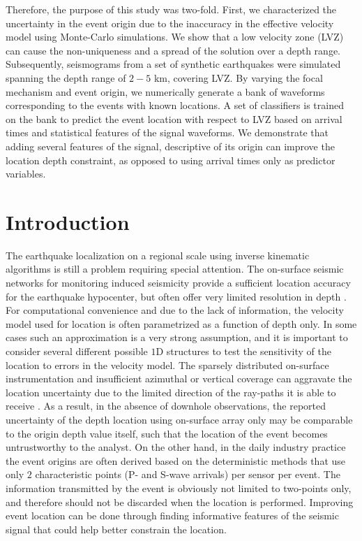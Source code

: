\documentclass[letterpaper,11pt]{article}
\begin{document}
Therefore, the purpose of this study was two-fold. First, we characterized the uncertainty in the event origin due to the inaccuracy in the effective velocity model using Monte-Carlo simulations. We show that a low velocity zone (\textsc{LVZ})  can cause the non-uniqueness and a spread of the solution over a depth range. Subsequently, seismograms from a set of synthetic earthquakes were simulated spanning the depth range of $2-5$ km, covering \textsc{LVZ}. By varying the focal mechanism and event origin, we numerically generate a bank of waveforms corresponding to the events with known locations. A set of classifiers is trained on the bank to predict the event location with respect to \textsc{LVZ} based on arrival times and statistical features of the signal waveforms. We demonstrate that adding several features of the signal, descriptive of its origin can improve the location depth constraint, as opposed to using arrival times only as predictor variables.
%
\section*{Introduction}
The earthquake localization on a regional scale using inverse kinematic algorithms is still a problem requiring special attention. The on-surface seismic networks for monitoring induced seismicity provide a sufficient location accuracy for the earthquake hypocenter, but often offer very limited resolution in depth \citep{eisner_uncertainties_2009}. For computational convenience and due to the lack of information, the velocity model used for location is often parametrized as a function of depth only. In some cases such an approximation is a very strong assumption, and it is important to consider several different possible $1$D structures to test the sensitivity of the location to errors in the velocity model. The sparsely distributed on-surface instrumentation and insufficient azimuthal or vertical coverage can aggravate the location uncertainty due to the limited direction of the ray-paths it is able to receive \citep{eisner_comparison_2010}. As a result, in the absence of downhole observations, the reported uncertainty of the depth location using on-surface array only may be comparable to the origin depth value itself, such that the location of the event becomes untrustworthy to the analyst. On the other hand, in the daily industry practice the event origins are often derived based on the deterministic methods that use only $2$ characteristic points (P- and S-wave arrivals) per sensor per event. The information transmitted by the event is obviously not limited to two-points only, and therefore should not be discarded when the location is performed. Improving event location can be done through finding informative features of the seismic signal that could help better constrain the location. 
\end{document}
